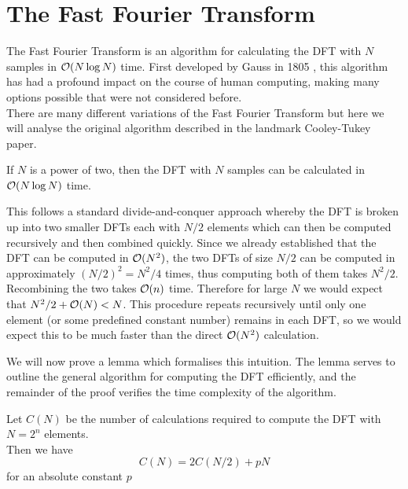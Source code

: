 \section{The Fast Fourier Transform}

The Fast Fourier Transform is an algorithm for calculating the DFT with $N$ samples in $\mathcal O(N \log N)$ time. First developed by Gauss in 1805 \cite{gauss}, this algorithm has had a profound impact on the course of human computing, making many options possible that were not considered before.\\
There are many different variations of the Fast Fourier Transform but here we will analyse the original algorithm described in the landmark Cooley-Tukey paper\cite{10.2307/2003354}.

\begin{theorem}\label{thm:fft}
    If $N$ is a power of two, then the DFT with $N$ samples can be calculated in $\mathcal O(N\log N)$ time.
\end{theorem}

This follows a standard divide-and-conquer approach whereby the DFT is broken up into two smaller DFTs each with $N/2$ elements which can then be computed recursively and then combined quickly. Since we already established that the DFT can be computed in $\mathcal O(N^2)$, the two DFTs of size $N/2$ can be computed in approximately $(N/2)^2 = N^2/4$ times, thus computing both of them takes $N^2 / 2$. Recombining the two takes $\mathcal O(n)$ time. Therefore for large $N$ we would expect that $N^2/2 + \mathcal O(N) < N$. This procedure repeats recursively until only one element (or some predefined constant number) remains in each DFT, so we would expect this to be much faster than the direct $\mathcal O(N^2)$ calculation.

We will now prove a lemma which formalises this intuition. The lemma serves to outline the general algorithm for computing the DFT efficiently, and the remainder of the proof verifies the time complexity of the algorithm.

\begin{lemma}
    Let $C(N)$ be the number of calculations required to compute the DFT with $N = 2^n$ elements.\\
    Then we have
    \begin{equation}
        C(N) = 2 C(N/2) + pN \label{eq:fftlem}
    \end{equation}
    for an absolute constant $p$
\end{lemma}

